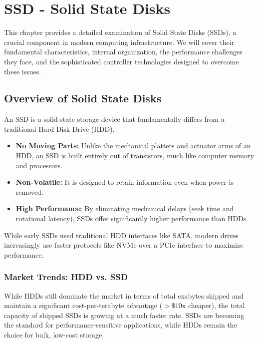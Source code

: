 \chapter{SSD - Solid State Disks}

This chapter provides a detailed examination of Solid State Disks (SSDs), a crucial component in modern computing infrastructure. We will cover their fundamental characteristics, internal organization, the performance challenges they face, and the sophisticated controller technologies designed to overcome these issues.

\section{Overview of Solid State Disks}
An SSD is a solid-state storage device that fundamentally differs from a traditional Hard Disk Drive (HDD).
\begin{itemize}
    \item \textbf{No Moving Parts:} Unlike the mechanical platters and actuator arms of an HDD, an SSD is built entirely out of transistors, much like computer memory and processors.
    \item \textbf{Non-Volatile:} It is designed to retain information even when power is removed.
    \item \textbf{High Performance:} By eliminating mechanical delays (seek time and rotational latency), SSDs offer significantly higher performance than HDDs.
\end{itemize}
While early SSDs used traditional HDD interfaces like SATA, modern drives increasingly use faster protocols like NVMe over a PCIe interface to maximize performance.

\subsection{Market Trends: HDD vs. SSD}
While HDDs still dominate the market in terms of total exabytes shipped and maintain a significant cost-per-terabyte advantage ($>\$10\text{x}$ cheaper), the total capacity of shipped SSDs is growing at a much faster rate. SSDs are becoming the standard for performance-sensitive applications, while HDDs remain the choice for bulk, low-cost storage.

